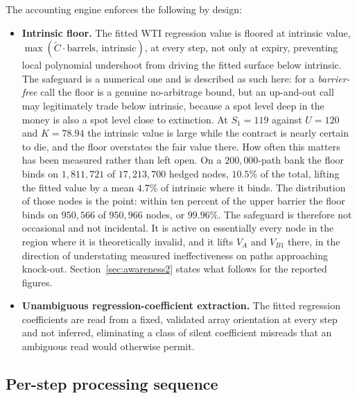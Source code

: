 \documentclass[11pt,a4paper]{article}
\begin{document}
The accounting engine enforces the following by design:
\begin{itemize}
\item \textbf{Intrinsic floor.} The fitted WTI regression value is floored at intrinsic value, $\max(\tilde C\cdot\mathrm{barrels},\,\mathrm{intrinsic})$, at every step, not only at expiry, preventing local polynomial undershoot from driving the fitted surface below intrinsic. The safeguard is a numerical one and is described as such here: for a \emph{barrier-free} call the floor is a genuine no-arbitrage bound, but an up-and-out call may legitimately trade below intrinsic, because a spot level deep in the money is also a spot level close to extinction. At $S_1=119$ against $U=120$ and $K=78.94$ the intrinsic value is large while the contract is nearly certain to die, and the floor overstates the fair value there. How often this matters has been measured rather than left open. On a $200{,}000$-path bank the floor binds on $1{,}811{,}721$ of $17{,}213{,}700$ hedged nodes, $10.5\%$ of the total, lifting the fitted value by a mean $4.7\%$ of intrinsic where it binds. The distribution of those nodes is the point: within ten percent of the upper barrier the floor binds on $950{,}566$ of $950{,}966$ nodes, or $99.96\%$. The safeguard is therefore not occasional and not incidental. It is active on essentially every node in the region where it is theoretically invalid, and it lifts $V_A$ and $V_{B1}$ there, in the direction of understating measured ineffectiveness on paths approaching knock-out. Section~\ref{sec:awareness2} states what follows for the reported figures.
\item \textbf{Unambiguous regression-coefficient extraction.} The fitted regression coefficients are read from a fixed, validated array orientation at every step and not inferred, eliminating a class of silent coefficient misreads that an ambiguous read would otherwise permit.
\end{itemize}

\subsection{Per-step processing sequence}
\label{sec:sequence}
\end{document}

